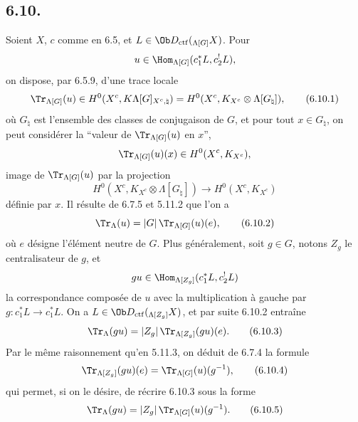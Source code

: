 \subsection*{6.10.}
Soient $X$, $c$ comme en 6.5, et $L\in\Ob D_{\mathrm{ctf}}({}_{\Lambda[G]}X)$. Pour
\[
u\in\Hom_{\Lambda[G]}(c_1^*L,c_2^!L),
\]
on dispose, par 6.5.9, d'une trace locale
\begin{equation}
\Tr_{\Lambda[G]}(u)\in
H^0(X^c,K\Lambda[G]_{X^c,\natural})
=H^0(X^c,K_{X^c}\otimes\Lambda[G_{\natural}]),
\tag{6.10.1}
\end{equation}
où $G_{\natural}$ est l'ensemble des classes de conjugaison de $G$, et pour tout $x\in G_{\natural}$, on peut considérer la ``valeur de $\Tr_{\Lambda[G]}(u)$ en $x$'',
\[
\Tr_{\Lambda[G]}(u)(x)\in H^0(X^c,K_{X^c}),
\]
image de $\Tr_{\Lambda[G]}(u)$ par la projection
\[
H^0(X^c,K_{X^c}\otimes\Lambda[G_{\natural}])
\longrightarrow H^0(X^c,K_{X^c})
\]
définie par $x$. Il résulte de 6.7.5 et 5.11.2 que l'on a
\begin{equation}
\Tr_{\Lambda}(u)=|G|\,\Tr_{\Lambda[G]}(u)(e),
\tag{6.10.2}
\end{equation}
où $e$ désigne l'élément neutre de $G$. Plus généralement, soit $g\in G$, notons $Z_g$ le centralisateur de $g$, et
\[
gu\in\Hom_{\Lambda[Z_g]}(c_1^*L,c_2^!L)
\]
la correspondance composée de $u$ avec la multiplication à gauche par $g:c_1^*L\to c_1^*L$. On a $L\in\Ob D_{\mathrm{ctf}}({}_{\Lambda[Z_g]}X)$, et par suite 6.10.2 entraîne
\begin{equation}
\Tr_{\Lambda}(gu)=|Z_g|\,\Tr_{\Lambda[Z_g]}(gu)(e).
\tag{6.10.3}
\end{equation}
Par le même raisonnement qu'en 5.11.3, on déduit de 6.7.4 la formule
\begin{equation}
\Tr_{\Lambda[Z_g]}(gu)(e)=\Tr_{\Lambda[G]}(u)(g^{-1}),
\tag{6.10.4}
\end{equation}
qui permet, si on le désire, de récrire 6.10.3 sous la forme
\begin{equation}
\Tr_{\Lambda}(gu)=|Z_g|\,\Tr_{\Lambda[G]}(u)(g^{-1}).
\tag{6.10.5}
\end{equation}

